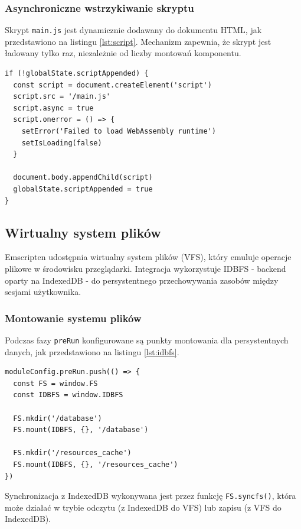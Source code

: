 \subsubsection{Asynchroniczne wstrzykiwanie skryptu}

Skrypt \texttt{main.js} jest dynamicznie dodawany do dokumentu HTML, jak przedstawiono na listingu \ref{lst:script}. Mechanizm zapewnia, że skrypt jest ładowany tylko raz, niezależnie od liczby montowań komponentu.

\begin{lstlisting}[style=javascript, caption={Dynamiczne ładowanie skryptu Emscripten}, label={lst:script}]
if (!globalState.scriptAppended) {
  const script = document.createElement('script')
  script.src = '/main.js'
  script.async = true
  script.onerror = () => {
    setError('Failed to load WebAssembly runtime')
    setIsLoading(false)
  }
  
  document.body.appendChild(script)
  globalState.scriptAppended = true
}
\end{lstlisting}

\subsection{Wirtualny system plików}

Emscripten udostępnia wirtualny system plików (VFS), który emuluje operacje plikowe w środowisku przeglądarki. Integracja wykorzystuje IDBFS - backend oparty na IndexedDB - do persystentnego przechowywania zasobów między sesjami użytkownika.

\subsubsection{Montowanie systemu plików}

Podczas fazy \texttt{preRun} konfigurowane są punkty montowania dla persystentnych danych, jak przedstawiono na listingu \ref{lst:idbfs}.

\begin{lstlisting}[style=javascript, caption={Konfiguracja IDBFS}, label={lst:idbfs}]
moduleConfig.preRun.push(() => {
  const FS = window.FS
  const IDBFS = window.IDBFS
  
  FS.mkdir('/database')
  FS.mount(IDBFS, {}, '/database')
  
  FS.mkdir('/resources_cache')
  FS.mount(IDBFS, {}, '/resources_cache')
})
\end{lstlisting}

Synchronizacja z IndexedDB wykonywana jest przez funkcję \texttt{FS.syncfs()}, która może działać w trybie odczytu (z IndexedDB do VFS) lub zapisu (z VFS do IndexedDB).


